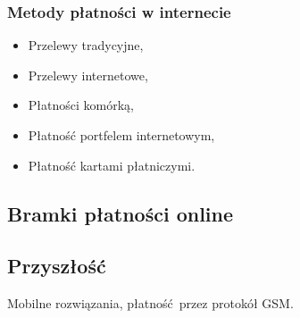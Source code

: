 \subsubsection*{Metody płatności w internecie}
\begin{itemize}
	\item Przelewy tradycyjne,
	\item Przelewy internetowe,
	\item Płatności komórką,
	\item Płatność portfelem internetowym,
	\item Płatność kartami płatniczymi.
\end{itemize}



\subsection{Bramki płatności online}



\subsection{Przyszłość}


Mobilne rozwiązania, płatność przez protokół GSM.
